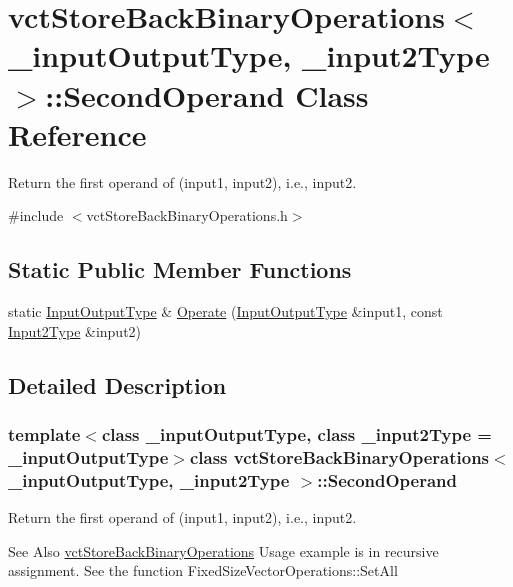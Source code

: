 \hypertarget{classvct_store_back_binary_operations_1_1_second_operand}{\section{vct\-Store\-Back\-Binary\-Operations$<$ \-\_\-input\-Output\-Type, \-\_\-input2\-Type $>$\-:\-:Second\-Operand Class Reference}
\label{classvct_store_back_binary_operations_1_1_second_operand}
}


Return the first operand of (input1, input2), i.\-e., input2.  




{\ttfamily \#include $<$vct\-Store\-Back\-Binary\-Operations.\-h$>$}

\subsection*{Static Public Member Functions}
\begin{DoxyCompactItemize}
\item 
static \hyperlink{classvct_store_back_binary_operations_a9dc481d9e1345541dd5d833d5e5688f3}{Input\-Output\-Type} \& \hyperlink{classvct_store_back_binary_operations_1_1_second_operand_a785a2bd98cce814bd044e3731204093c}{Operate} (\hyperlink{classvct_store_back_binary_operations_a9dc481d9e1345541dd5d833d5e5688f3}{Input\-Output\-Type} \&input1, const \hyperlink{classvct_store_back_binary_operations_a65a7197563c794a879fb50a406e70c8f}{Input2\-Type} \&input2)
\end{DoxyCompactItemize}


\subsection{Detailed Description}
\subsubsection*{template$<$class \-\_\-input\-Output\-Type, class \-\_\-input2\-Type = \-\_\-input\-Output\-Type$>$class vct\-Store\-Back\-Binary\-Operations$<$ \-\_\-input\-Output\-Type, \-\_\-input2\-Type $>$\-::\-Second\-Operand}

Return the first operand of (input1, input2), i.\-e., input2. 

\begin{DoxySeeAlso}{See Also}
\hyperlink{classvct_store_back_binary_operations}{vct\-Store\-Back\-Binary\-Operations} Usage example is in recursive assignment. See the function Fixed\-Size\-Vector\-Operations\-::\-Set\-All 
\end{DoxySeeAlso}


